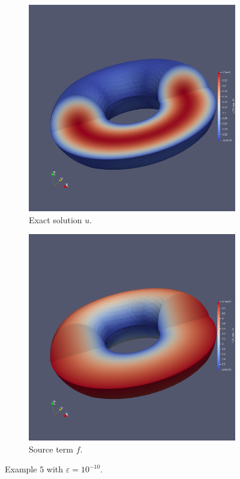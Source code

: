 \documentclass[12pt,a4paper]{article}
\begin{document}
\begin{figure}[H]
 \begin{subfigure}{0.5\textwidth}
     \includegraphics[width=\textwidth]{Pics/uf/U_E5_eps_10.png}
     \caption{Exact solution $u$.}
 \end{subfigure}
   \begin{subfigure}{0.5\textwidth}
     \includegraphics[width=\textwidth]{Pics/uf/F_E5_eps_10.png}
     \caption{Source term $f$.}
 \end{subfigure}
 \caption{Example $5$ with $\varepsilon = 10^{-10}$.} \label{E5_uf}
\end{figure}
\end{document}
